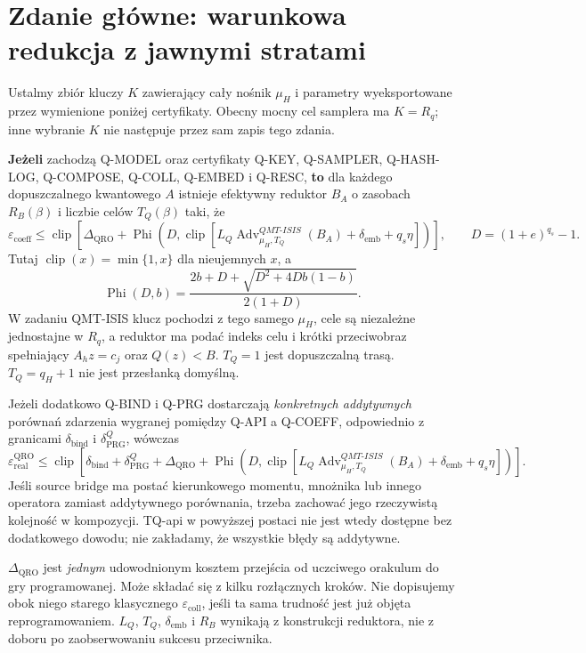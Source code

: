 \documentclass[11pt,a4paper]{article}
\newcommand{\Adv}{\operatorname{Adv}}
\newcommand{\clip}{\operatorname{clip}}
\newcommand{\PhiB}{\operatorname{Phi}}
\begin{document}
\section{Zdanie główne: warunkowa redukcja z jawnymi stratami}
Ustalmy zbiór kluczy $K$ zawierający cały nośnik $\mu_H$ i parametry
wyeksportowane przez wymienione poniżej certyfikaty. Obecny mocny cel
samplera ma $K=R_q$; inne wybranie $K$ nie następuje przez sam zapis tego zdania.

\textbf{Jeżeli} zachodzą Q-MODEL oraz certyfikaty Q-KEY, Q-SAMPLER,
Q-HASH-LOG, Q-COMPOSE, Q-COLL, Q-EMBED i Q-RESC,
\textbf{to} dla każdego dopuszczalnego kwantowego $A$ istnieje efektywny
reduktor $B_A$ o zasobach $R_B(\beta)$ i liczbie celów $T_Q(\beta)$ taki, że
\[
 \varepsilon_{\mathrm{coeff}}\le
 \clip\!\left[\Delta_{\mathrm{QRO}}+
 \PhiB\!\left(D,\clip\!\left[
 L_Q\Adv^{QMT\text{-}ISIS}_{\mu_H,T_Q}(B_A)
       +\delta_{\mathrm{emb}}+q_s\eta\right]\right)\right],
 \qquad D=(1+e)^{q_s}-1.                         \tag{TQ-core}
\]
Tutaj $\clip(x)=\min\{1,x\}$ dla nieujemnych $x$, a
\[
 \PhiB(D,b)=\frac{2b+D+\sqrt{D^2+4Db(1-b)}}{2(1+D)}.
\]
W zadaniu QMT-ISIS klucz pochodzi z tego samego $\mu_H$, cele są niezależne
jednostajne w $R_q$, a reduktor ma podać indeks celu i krótki przeciwobraz
spełniający $A_hz=c_j$ oraz $Q(z)<B$.
$T_Q=1$ jest dopuszczalną trasą. $T_Q=q_H+1$ nie jest przesłanką domyślną.

Jeżeli dodatkowo Q-BIND i Q-PRG dostarczają \emph{konkretnych addytywnych}
porównań zdarzenia wygranej pomiędzy Q-API a Q-COEFF, odpowiednio
z granicami $\delta_{\mathrm{bind}}$ i $\delta_{\mathrm{PRG}}^Q$, wówczas
\[
 \varepsilon_{\mathrm{real}}^{\mathrm{QRO}}\le
 \clip\!\left[\delta_{\mathrm{bind}}+\delta_{\mathrm{PRG}}^Q
 +\Delta_{\mathrm{QRO}}+
 \PhiB\!\left(D,\clip\!\left[
 L_Q\Adv^{QMT\text{-}ISIS}_{\mu_H,T_Q}(B_A)
       +\delta_{\mathrm{emb}}+q_s\eta\right]\right)\right]. \tag{TQ-api}
\]
Jeśli source bridge ma postać kierunkowego momentu, mnożnika lub innego
operatora zamiast addytywnego porównania, trzeba zachować jego rzeczywistą
kolejność w kompozycji. TQ-api w powyższej postaci nie jest wtedy dostępne
bez dodatkowego dowodu; nie zakładamy, że wszystkie błędy są addytywne.

$\Delta_{\mathrm{QRO}}$ jest \emph{jednym} udowodnionym kosztem przejścia
od uczciwego orakulum do gry programowanej. Może składać się z kilku
rozłącznych kroków. Nie dopisujemy obok niego starego klasycznego
$\varepsilon_{\mathrm{coll}}$, jeśli ta sama trudność jest już objęta
reprogramowaniem. $L_Q$, $T_Q$, $\delta_{\mathrm{emb}}$ i $R_B$ wynikają
z konstrukcji reduktora, nie z doboru po zaobserwowaniu sukcesu przeciwnika.
\end{document}
